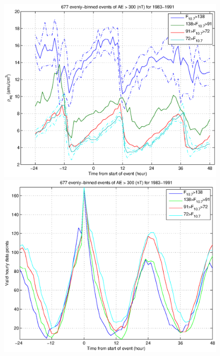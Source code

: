 \documentclass[10pt,twocolumn]{article}
\begin{document}
\begin{figure}[htp!]
\includegraphics[scale=0.40]{paperfigures/HighLowF107rhoeq-AE300.eps}
\includegraphics[scale=0.40]{paperfigures/HighLowF107rhoeq-AE300-valid.eps}

\end{figure}
\end{document}
